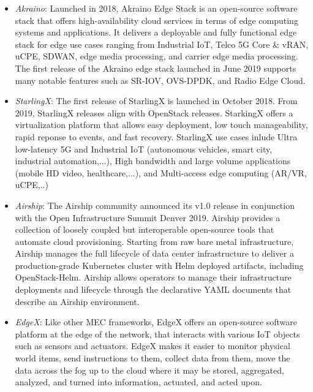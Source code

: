 \begin{itemize}

\item \textit{\textit{Akraino}}: Launched in 2018, Akraino Edge Stack is an open-source software stack that offers high-availability cloud services in terms of edge computing systems and applications. It delivers a deployable and fully functional edge stack for edge use cases ranging from Industrial IoT, Telco 5G Core \& vRAN, uCPE, SDWAN, edge media processing, and carrier edge media processing. The first release of the Akraino edge stack launched in June 2019 supports many notable features such as SR-IOV, OVS-DPDK, and Radio Edge Cloud.  

\item \textit{\textit{StarlingX}}: The first release of StarlingX is launched in October 2018. From 2019, StarlingX releases align with OpenStack releases. StarkingX offers a virtualization platform that allows easy deployment, low touch manageability, rapid reponse to events, and fast recovery. StarlingX use cases inlude Ultra low-latency 5G and Industrial IoT (autonomous vehicles, smart city, industrial automation,...), High bandwidth and large volume applications (mobile HD video, healthcare,...), and Multi-access edge computing (AR/VR, uCPE,..)

\item \textit{\textit{Airship}}: The Airship community announced its v1.0 release in conjunction with the Open Infrastructure Summit Denver 2019. Airship provides a collection of loosely coupled but interoperable open-source tools that automate cloud provisioning. Starting from raw bare metal infrastructure, Airship manages the full lifecycle of data center infrastructure to deliver a production-grade Kubernetes cluster with Helm deployed artifacts, including OpenStack-Helm. Airship allows operators to manage their infrastructure deployments and lifecycle through the declarative YAML documents that describe an Airship environment.

\item \textit{\textit{EdgeX}}: Like other MEC frameworks, EdgeX offers an open-source software platform at the edge of the network, that interacts with various IoT objects such as sensors and actuators. EdgeX makes it easier to monitor physical world items, send instructions to them, collect data from them, move the data across the fog up to the cloud where it may be stored, aggregated, analyzed, and turned into information, actuated, and acted upon.


\end{itemize}
